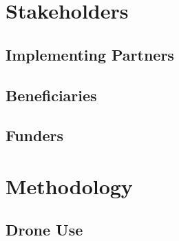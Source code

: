 \documentclass[a4paper,12pt,twoside]{article}
\begin{document}
\begin{multicols}{2}

\lipsum[0-5]

\end{multicols}

\section{Stakeholders}

\begin{multicols}{2}
\lipsum[0-5]
\end{multicols}

\subsection{Implementing Partners}

\begin{multicols}{2}
\lipsum[0-5]
\end{multicols}

\subsection{Beneficiaries}

\begin{multicols}{2}
\lipsum[0-5]
\end{multicols}

\subsection{Funders}

\begin{multicols}{2}
\lipsum[0-5]
\end{multicols}

\section{Methodology}

\begin{multicols}{2}
\lipsum[0-5]
\end{multicols}

\subsection{Drone Use}

\begin{multicols}{2}
\lipsum[0-5]
\end{multicols}
\end{document}

